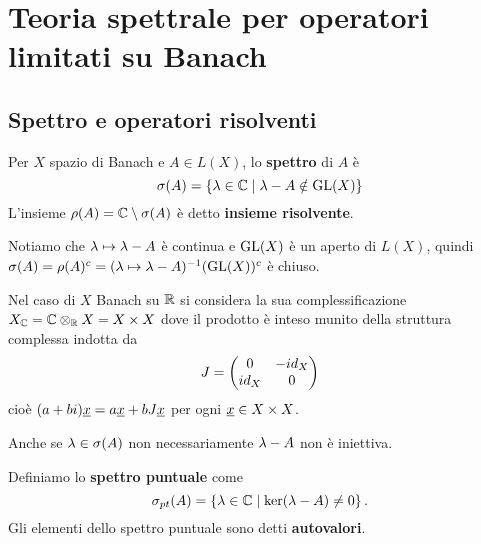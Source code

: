 \chapter{Teoria spettrale per operatori limitati su Banach}
\section{Spettro e operatori risolventi}

\begin{definition}
Per $X$ spazio di Banach e $A\in L(X)$, lo \textbf{spettro} di $A$ \`e
\[\sigma(A)=\left\{{\lambda\in\mathbb{C}\mid \lambda-A\notin \mathrm{GL}(X)}\right\}\]
L'insieme $\rho(A)=\mathbb{C}\setminus \sigma(A)$ \`e detto \textbf{insieme risolvente}.
\end{definition}

\begin{remark}
Notiamo che $\lambda\mapsto \lambda-A$ \`e continua e $\mathrm{GL}(X)$ \`e un aperto di $L(X)$, quindi $\sigma(A)=\rho(A)^c=(\lambda\mapsto\lambda-A)^{-1}(\mathrm{GL}(X))^c$ \`e chiuso.
\end{remark}

\begin{remark}
Nel caso di $X$ Banach su $\mathbb{R}$ si considera la sua complessificazione $X_{\mathbb{C}}=\mathbb{C}\otimes_{\mathbb{R}} X=X\times X$ dove il prodotto \`e inteso munito della struttura complessa indotta da
\[J=\begin{pmatrix}0&-id_X\\id_X&0\end{pmatrix}\]
cio\`e $(a+bi){\underline{x}}=a{\underline{x}} +bJ{\underline{x}}$ per ogni ${\underline{x}}\in X\times X$.
\end{remark}

\begin{remark}
Anche se $\lambda\in \sigma(A)$ non necessariamente $\lambda-A$ non \`e iniettiva. 
\end{remark}

\begin{definition}
Definiamo lo \textbf{spettro puntuale} come
\[\sigma_{pt}(A)=\left\{{\lambda\in \mathbb{C}\mid \ker(\lambda-A)\neq 0}\right\}.\]
Gli elementi dello spettro puntuale sono detti \textbf{autovalori}.
\end{definition}


